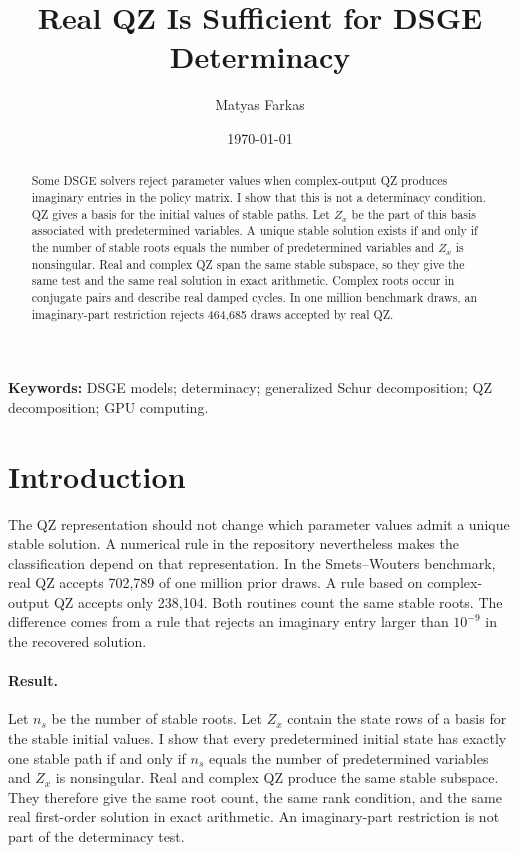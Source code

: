 \documentclass[11pt]{article}
\title{Real QZ Is Sufficient for DSGE Determinacy}
\author{Matyas Farkas}
\date{\today}
\begin{document}
\maketitle

\begin{abstract}
Some DSGE solvers reject parameter values when complex-output QZ produces
imaginary entries in the policy matrix. I show that this is not a determinacy
condition. QZ gives a basis for the initial values of stable paths. Let $Z_x$
be the part of this basis associated with predetermined variables. A unique
stable solution exists if and only if the number of stable roots equals the
number of predetermined variables and $Z_x$ is nonsingular. Real and complex
QZ span the same stable subspace, so they give the same test and the same real
solution in exact arithmetic. Complex roots occur in conjugate pairs and
describe real damped cycles. In one million benchmark draws, an imaginary-part
restriction rejects 464,685 draws accepted by real QZ.
\end{abstract}

\noindent\textbf{Keywords:} DSGE models; determinacy; generalized Schur
decomposition; QZ decomposition; GPU computing.

\section{Introduction}

The QZ representation should not change which parameter values admit a unique
stable solution. A numerical rule in the repository nevertheless makes the
classification depend on that representation. In the Smets--Wouters
benchmark, real QZ accepts 702,789 of one million prior draws. A rule based on
complex-output QZ accepts only 238,104. Both routines count the same stable
roots. The difference comes from a rule that rejects an imaginary entry larger
than $10^{-9}$ in the recovered solution.

\paragraph{Result.}
Let $n_s$ be the number of stable roots. Let $Z_x$ contain the state rows of a
basis for the stable initial values. I show that every predetermined initial
state has exactly one stable path if and only if $n_s$ equals the number of
predetermined variables and $Z_x$ is nonsingular. Real and complex QZ produce
the same stable subspace. They therefore give the same root count, the same
rank condition, and the same real first-order solution in exact arithmetic.
An imaginary-part restriction is not part of the determinacy test.
\end{document}
